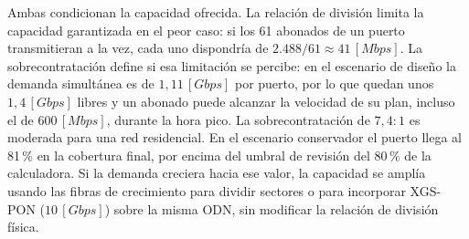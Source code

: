 Ambas condicionan la capacidad ofrecida. La relación de división limita la capacidad garantizada en el peor caso: si los 61 abonados de un puerto transmitieran a la vez, cada uno dispondría de $2.488 / 61 \approx 41 \, [Mbps]$. La sobrecontratación define si esa limitación se percibe: en el escenario de diseño la demanda simultánea es de $1{,}11 \, [Gbps]$ por puerto, por lo que quedan unos $1{,}4 \, [Gbps]$ libres y un abonado puede alcanzar la velocidad de su plan, incluso el de $600 \, [Mbps]$, durante la hora pico. La sobrecontratación de $7{,}4:1$ es moderada para una red residencial. En el escenario conservador el puerto llega al 81\,\% en la cobertura final, por encima del umbral de revisión del 80\,\% de la calculadora. Si la demanda creciera hacia ese valor, la capacidad se amplía usando las fibras de crecimiento para dividir sectores o para incorporar XGS-PON ($10 \, [Gbps]$) sobre la misma ODN, sin modificar la relación de división física.
